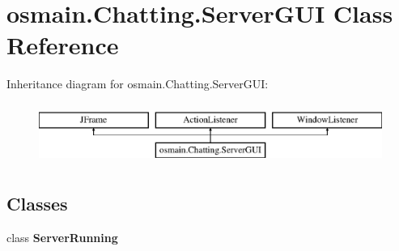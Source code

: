 \hypertarget{classosmain_1_1_chatting_1_1_server_g_u_i}{}\section{osmain.\+Chatting.\+Server\+G\+UI Class Reference}
\label{classosmain_1_1_chatting_1_1_server_g_u_i}
Inheritance diagram for osmain.\+Chatting.\+Server\+G\+UI\+:\begin{figure}[H]
\begin{center}
\leavevmode
\includegraphics[height=2.000000cm]{classosmain_1_1_chatting_1_1_server_g_u_i}
\end{center}
\end{figure}
\subsection*{Classes}
\begin{DoxyCompactItemize}
\item 
class {\bfseries Server\+Running}
\end{DoxyCompactItemize}
